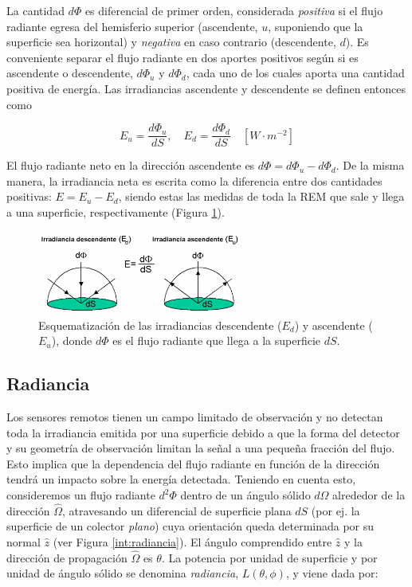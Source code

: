         La cantidad $d\Phi$ es diferencial de primer orden, considerada \textit{positiva} si el flujo radiante egresa del hemisferio superior (ascendente, $u$, suponiendo que la superficie sea horizontal) y \textit{negativa} en caso contrario (descendente, $d$). Es conveniente separar el flujo radiante en dos aportes positivos según si es ascendente o descendente, $d\Phi_{u}$ y $d\Phi_{d}$, cada uno de los cuales aporta una cantidad positiva de energía. Las irradiancias ascendente y descendente se definen entonces como
        
        \begin{equation}
         E_{u}=\frac{d\Phi_{u}}{dS}, \quad
         E_{d}=\frac{d\Phi_{d}}{dS}\quad [W\cdot m^{-2}]
        \label{int:eq:irrad_ascen_descen}
        \end{equation}
        
        El flujo radiante neto en la dirección ascendente es $d\Phi=d\Phi_{u}-d\Phi_{d}$. De la misma manera, la irradiancia neta es escrita como la diferencia entre dos cantidades positivas: $E=E_{u}-E_{d}$, siendo estas las medidas de toda la REM que sale y llega a una superficie, respectivamente (Figura \ref{int:irradiancia}).
        
        \begin{figure}
        \centering
        \includegraphics[width=0.6\textwidth]{int/figures/irradiancia}
        \caption[Esquematización de las irradiancias descendente ($E_{d}$) y ascendente ($E_{u}$).]{Esquematización de las irradiancias descendente ($E_{d}$) y ascendente ($E_{u}$), donde $d\Phi$ es el flujo radiante que llega a la superficie $dS$.} 
        \label{int:irradiancia}
        \end{figure}

	\subsection{Radiancia}
	\label{int:s:radiancia}
        Los sensores remotos tienen un campo limitado de observación y no detectan toda la irradiancia emitida por una superficie debido a que la forma del detector y su geometría de observación limitan la señal a una pequeña fracción del flujo. Esto implica que la dependencia del flujo radiante en función de la dirección tendrá un impacto sobre la energía detectada.
        Teniendo en cuenta esto, consideremos un flujo radiante $d^{2}\Phi$ dentro de un ángulo sólido $d\Omega$ alrededor de la dirección $\hat{\Omega}$, atravesando un diferencial de superficie plana $dS$ (por ej. la superficie de un colector \textit{plano}) cuya orientación queda determinada por su normal $\hat{z}$ (ver Figura \ref{int:radiancia}). El ángulo comprendido entre $\hat{z}$ y la dirección de propagación $\hat{\Omega}$ es $\theta$. La potencia por unidad de superficie y por unidad de ángulo sólido se denomina \textit{radiancia}, $L(\theta,\phi)$, y viene dada por:
        
